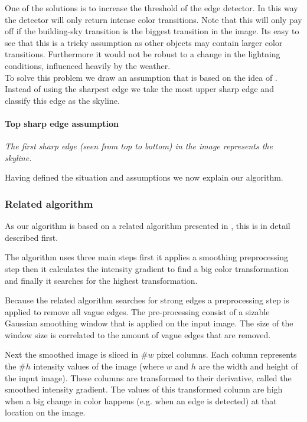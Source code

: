 One of the solutions is to increase the threshold of the edge detector. In this
way the detector will only return intense color transitions. Note that this will
only pay off if the building-sky transition is the biggest transition in the image. 
Its easy to see that this is a tricky assumption as other objects may contain
larger color transitions. Furthermore it would not be robust to a change in
the lightning conditions, influenced heavily by the weather.\\

To solve this problem we draw an assumption that is based on the
idea of \cite{Rover}. Instead of using the sharpest edge we take the most upper sharp
edge and classify this edge as the skyline.\\

\paragraph{Top sharp edge assumption}
\emph{The first sharp edge (seen from top to bottom) in the image 
represents the skyline.}

Having defined the situation and assumptions we now explain our algorithm.

\subsubsection{Related algorithm}
As our algorithm is based on a related algorithm presented in \cite{Rover},
this is in detail described first.


The algorithm uses three main steps first it applies a smoothing preprocessing
step then it calculates the intensity gradient to find a big color transformation
and finally it searches for the highest transformation.

Because the related algorithm searches for strong edges a preprocessing step is
applied to remove all vague edges. The pre-processing consist of a sizable Gaussian
smoothing window that is applied on the input image. The size of the window size
is correlated to the amount of vague edges that are removed.

Next the smoothed image is sliced in \#$w$ pixel columns. Each column represents
the \#$h$ intensity values of the image (where $w$ and $h$ are the width and height of
the input image). 
These columns are transformed to their derivative, called the smoothed intensity gradient. The values
of this transformed column are high when a big change in color happens (e.g.
when an edge is detected) at that location on the image.\\

